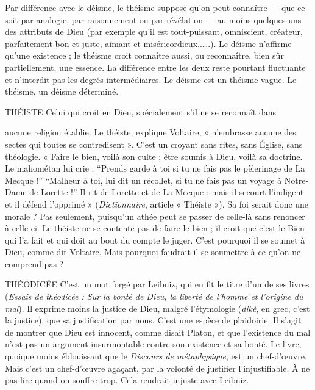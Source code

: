Par différence avec le déisme, le théisme suppose qu’on peut connaître —
que ce soit par analogie, par raisonnement ou par révélation — au moins
quelques-uns des attributs de Dieu (par exemple qu’il est tout-puissant, omniscient,
créateur, parfaitement bon et juste, aimant et miséricordieux..….). Le
déisme n’affirme qu’une existence ; le théisme croit connaître aussi, ou reconnaître,
bien sûr partiellement, une essence. La différence entre les deux reste
pourtant fluctuante et n’interdit pas les degrés intermédiaires. Le déisme est un
théisme vague. Le théisme, un déisme déterminé.

THÉISTE Celui qui croit en Dieu, spécialement s’il ne se reconnaît dans

aucune religion établie. Le théiste, explique Voltaire, « n’embrasse
aucune des sectes qui toutes se contredisent ». C’est un croyant sans rites, sans
Église, sans théologie. « Faire le bien, voilà son culte ; être soumis à Dieu, voilà
sa doctrine. Le mahométan lui crie : “Prends garde à toi si tu ne fais pas le pèlerinage
de La Mecque !” “Malheur à toi, lui dit un récollet, si tu ne fais pas un
voyage à Notre-Dame-de-Lorette !” Il rit de Lorette et de La Mecque ; mais il
secourt l’indigent et il défend l'opprimé » ({\it Dictionnaire}, article « Théiste »).
Sa foi serait donc une morale ? Pas seulement, puisqu’un athée peut se passer
de celle-là sans renoncer à celle-ci. Le théiste ne se contente pas de faire le bien ;
il croit que c’est le Bien qui l’a fait et qui doit au bout du compte le juger. C’est
pourquoi il se soumet à Dieu, comme dit Voltaire. Mais pourquoi faudrait-il se
soumettre à ce qu’on ne comprend pas ?

THÉODICÉE C’est un mot forgé par Leibniz, qui en fit le titre d’un de ses
livres ({\it Essais de théodicée : Sur la bonté de Dieu, la liberté de
l’homme et l'origine du mal}). Il exprime moins la justice de Dieu, malgré l’étymologie
({\it dikè}, en grec, c’est la justice), que sa justification par nous. C’est une
espèce de plaidoirie. Il s’agit de montrer que Dieu est innocent, comme disait
Platon, et que l'existence du mal n’est pas un argument insurmontable contre
son existence et sa bonté. Le livre, quoique moins éblouissant que le {\it Discours de
métaphysique}, est un chef-d'œuvre. Mais c’est un chef-d'œuvre agaçant, par la
volonté de justifier l’injustifiable. À ne pas lire quand on souffre trop. Cela rendrait
injuste avec Leibniz.

